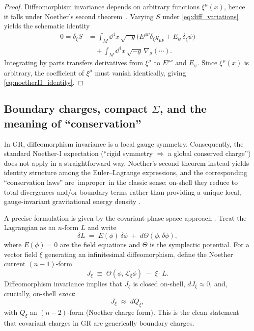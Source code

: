 \documentclass[
  reprint,
  amsmath,amssymb,
  aps,
  prd,
  superscriptaddress,
  nofootinbib,
  longbibliography
]{revtex4-2}
\newcommand{\Sig}{\Sigma}
\newcommand{\Lie}{\mathcal L}
\theoremstyle{definition}
\theoremstyle{remark}
\begin{document}
\begin{proof}
Diffeomorphism invariance depends on arbitrary functions $\xi^\mu(x)$, hence it falls under Noether's second theorem~\cite{Noether1918}.
Varying $S$ under \eqref{eq:diff_variations} yields the schematic identity
\begin{align}
0=\delta_\xi S
&=\int_M \dd^4x\,\sqrt{-g}\Big(E^{\mu\nu}\delta_\xi g_{\mu\nu}+E_\psi\,\delta_\xi\psi\Big)
\nonumber\\
&\quad+\int_M \dd^4x\,\sqrt{-g}\,\nabla_\mu(\cdots).
\end{align}
Integrating by parts transfers derivatives from $\xi^\mu$ to $E^{\mu\nu}$ and $E_\psi$. Since $\xi^\mu(x)$ is
arbitrary, the coefficient of $\xi^\mu$ must vanish identically, giving \eqref{eq:noetherII_identity}.
\end{proof}

\subsection{Boundary charges, compact \texorpdfstring{$\Sig$}{Sigma}, and the meaning of ``conservation''}
In GR, diffeomorphism invariance is a local gauge symmetry. Consequently, the standard Noether-I expectation
(``rigid symmetry $\Rightarrow$ a global conserved charge'') does not apply in a straightforward way.
Noether's second theorem instead yields identity structure among the Euler--Lagrange expressions, and the
corresponding ``conservation laws'' are \,improper\, in the classic sense: on-shell they reduce to total divergences
and/or boundary terms rather than providing a unique local, gauge-invariant gravitational energy density
\cite{Noether1918,BradingBrown2003}.

A precise formulation is given by the covariant phase space approach \cite{LeeWald1990,IyerWald1994,WaldBook}.
Treat the Lagrangian as an $n$-form $L$ and write
\begin{equation}
\delta L \;=\; E(\phi)\,\delta\phi \; +\; d\Theta(\phi,\delta\phi),
\end{equation}
where $E(\phi)=0$ are the field equations and $\Theta$ is the symplectic potential. For a vector field $\xi$
generating an infinitesimal diffeomorphism, define the Noether current $(n\! -\! 1)$-form
\begin{equation}
J_{\xi} \;\equiv\; \Theta(\phi,\Lie_{\xi}\phi)\; -\; \xi\cdot L.
\end{equation}
Diffeomorphism invariance implies that $J_{\xi}$ is closed on-shell, $dJ_{\xi}\approx 0$, and, crucially, on-shell
\emph{exact}:
\begin{equation}
J_{\xi} \;\approx\; dQ_{\xi},
\label{eq:noether_current_exact}
\end{equation}
with $Q_{\xi}$ an $(n\! -\! 2)$-form (Noether charge form). This is the clean statement that covariant charges in GR
are generically boundary charges.
\end{document}
